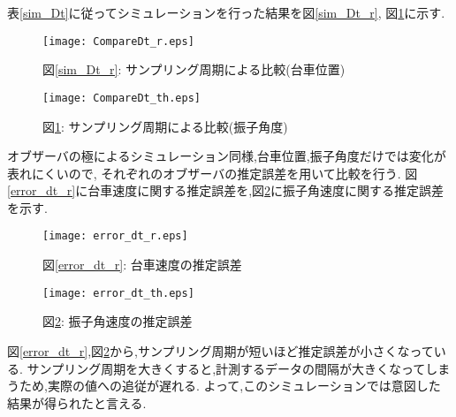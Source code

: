 表\ref{sim_Dt}に従ってシミュレーションを行った結果を図\ref{sim_Dt_r}, 図\ref{sim_Dt_th}に示す.

\begin{figure}[htbp]
    \begin{minipage}{0.5\hsize}
        \begin{center}
            \texttt{[image: CompareDt\_r.eps]}
            \caption{図\ref{sim_Dt_r}: サンプリング周期による比較(台車位置)}
            \label{sim_Dt_r}
        \end{center}
    \end{minipage}
    \begin{minipage}{0.5\hsize}
        \begin{center}
            \texttt{[image: CompareDt\_th.eps]}
            \caption{図\ref{sim_Dt_th}: サンプリング周期による比較(振子角度)}
            \label{sim_Dt_th}
        \end{center}
    \end{minipage}
\end{figure}

オブザーバの極によるシミュレーション同様,台車位置,振子角度だけでは変化が表れにくいので,
それぞれのオブザーバの推定誤差を用いて比較を行う.
図\ref{error_dt_r}に台車速度に関する推定誤差を,図\ref{error_dt_th}に振子角速度に関する推定誤差を示す.

\begin{figure}[htbp]
    \begin{minipage}{0.5\hsize}
        \begin{center}
            \texttt{[image: error\_dt\_r.eps]}
            \caption{図\ref{error_dt_r}: 台車速度の推定誤差}
            \label{error_dt_r}
        \end{center}
    \end{minipage}
    \begin{minipage}{0.5\hsize}
        \begin{center}
            \texttt{[image: error\_dt\_th.eps]}
            \caption{図\ref{error_dt_th}: 振子角速度の推定誤差}
            \label{error_dt_th}
        \end{center}
    \end{minipage}
\end{figure}

図\ref{error_dt_r},図\ref{error_dt_th}から,サンプリング周期が短いほど推定誤差が小さくなっている.
サンプリング周期を大きくすると,計測するデータの間隔が大きくなってしまうため,実際の値への追従が遅れる.
よって,このシミュレーションでは意図した結果が得られたと言える.


